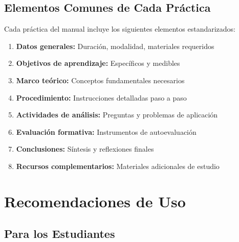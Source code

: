 \documentclass[12pt,a4paper]{book}
\begin{document}
	\subsection{Elementos Comunes de Cada Práctica}
	
	Cada práctica del manual incluye los siguientes elementos estandarizados:
	
	\begin{enumerate}
		\item \textbf{Datos generales:} Duración, modalidad, materiales requeridos
		\item \textbf{Objetivos de aprendizaje:} Específicos y medibles
		\item \textbf{Marco teórico:} Conceptos fundamentales necesarios
		\item \textbf{Procedimiento:} Instrucciones detalladas paso a paso
		\item \textbf{Actividades de análisis:} Preguntas y problemas de aplicación
		\item \textbf{Evaluación formativa:} Instrumentos de autoevaluación
		\item \textbf{Conclusiones:} Síntesis y reflexiones finales
		\item \textbf{Recursos complementarios:} Materiales adicionales de estudio
	\end{enumerate}
	
	\section{Recomendaciones de Uso}
	
	\subsection{Para los Estudiantes}
	
\end{document}
